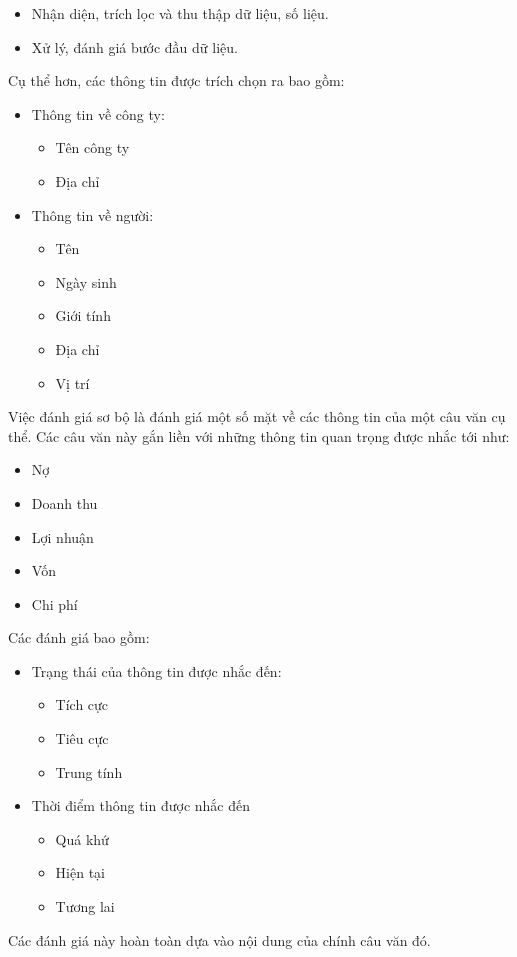 \documentclass[14pt]{extreport}
\begin{document}
\begin{itemize}
    \item Nhận diện, trích lọc và thu thập dữ liệu, số liệu.
    \item Xử lý, đánh giá bước đầu dữ liệu.
\end{itemize}
Cụ thể hơn, các thông tin được trích chọn ra bao gồm:
\begin{itemize}
    \item Thông tin về công ty:
    \begin{itemize}
        \item Tên công ty
        \item Địa chỉ
    \end{itemize}
    \item Thông tin về người:
    \begin{itemize}
        \item Tên
        \item Ngày sinh
        \item Giới tính
        \item Địa chỉ
        \item Vị trí
    \end{itemize}
\end{itemize}
Việc đánh giá sơ bộ là đánh giá một số mặt về các thông tin của một câu văn cụ thể. Các câu văn này gắn liền với những thông tin quan trọng được nhắc tới như:
\begin{itemize}
    \item Nợ
    \item Doanh thu
    \item Lợi nhuận
    \item Vốn
    \item Chi phí
\end{itemize}
Các đánh giá bao gồm:
\begin{itemize}
    \item Trạng thái của thông tin được nhắc đến:
    \begin{itemize}
        \item Tích cực
        \item Tiêu cực
        \item Trung tính
    \end{itemize}
    \item Thời điểm thông tin được nhắc đến
    \begin{itemize}
        \item Quá khứ
        \item Hiện tại
        \item Tương lai
    \end{itemize}
\end{itemize}
Các đánh giá này hoàn toàn dựa vào nội dung của chính câu văn đó.
\end{document}
